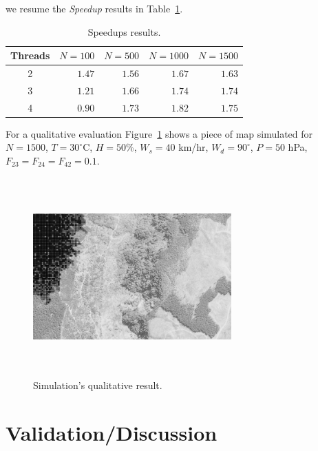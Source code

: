 \documentclass[conference]{IEEEtran}
\begin{document}
    we resume the \emph{Speedup} results in Table~\ref{tab:speedups}.
    
    \begin{table}[!ht]
        \renewcommand{\arraystretch}{1.3}
        \centering
        \caption{Speedups results.}
        \label{tab:speedups}
        \begin{tabular}{c||rrrr}
            \hline
            Threads & $N=100$ & $N=500$ & $N=1000$ & $N=1500$ \\ \hline\hline
            2       & $1.47$ & $1.56$ & $1.67$ & $1.63$ \\
            3       & $1.21$ & $1.66$ & $1.74$ & $1.74$ \\
            4       & $0.90$ & $1.73$ & $1.82$ & $1.75$  
        \end{tabular}
    \end{table}
    
    
    For a qualitative evaluation Figure~\ref{fig:simulation} shows a piece of map simulated for 
    $N=1500$, $T=30^{\circ}$C, $H=50$\%, $W_s=40$ km/hr, $W_d=90^{\circ}$, $P=50$ hPa, 
    $F_{23} = F_{24}= F_{42} = 0.1$.
    
    \begin{figure}[!ht]
        \centering
        \includegraphics[width=3in,height=3in,clip,keepaspectratio]{img/simulation_gray.png}
        \caption{Simulation's qualitative result.}
        \label{fig:simulation}
    \end{figure}
    

\section{Validation/Discussion}
    
\end{document}

